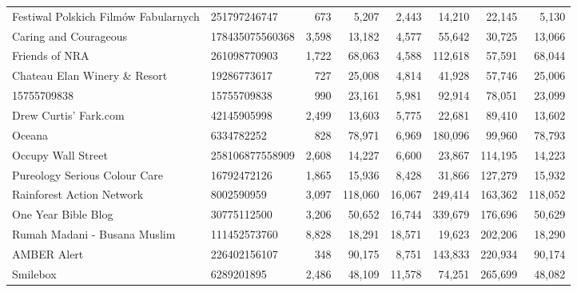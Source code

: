\begin{longtable}{llrrrrrr}
              Festiwal Polskich Filmów Fabularnych &     251797246747 &     673 &       5,207 &      2,443 &      14,210 &      22,145 &     5,130 \\
                             Caring and Courageous &  178435075560368 &   3,598 &      13,182 &      4,577 &      55,642 &      30,725 &    13,066 \\
                                    Friends of NRA &     261098770903 &   1,722 &      68,063 &      4,588 &     112,618 &      57,591 &    68,044 \\
                     Chateau Elan Winery \& Resort &      19286773617 &     727 &      25,008 &      4,814 &      41,928 &      57,746 &    25,006 \\
                                       15755709838 &      15755709838 &     990 &      23,161 &      5,981 &      92,914 &      78,051 &    23,099 \\
                             Drew Curtis' Fark.com &      42145905998 &   2,499 &      13,603 &      5,775 &      22,681 &      89,410 &    13,602 \\
                                            Oceana &       6334782252 &     828 &      78,971 &      6,969 &     180,096 &      99,960 &    78,793 \\
                                Occupy Wall Street &  258106877558909 &   2,608 &      14,227 &      6,600 &      23,867 &     114,195 &    14,223 \\
                     Pureology Serious Colour Care &      16792472126 &   1,865 &      15,936 &      8,428 &      31,866 &     127,279 &    15,932 \\
                         Rainforest Action Network &       8002590959 &   3,097 &     118,060 &     16,067 &     249,414 &     163,362 &   118,052 \\
                               One Year Bible Blog &      30775112500 &   3,206 &      50,652 &     16,744 &     339,679 &     176,696 &    50,629 \\
                      Rumah Madani - Busana Muslim &     111452573760 &   8,828 &      18,291 &     18,571 &      19,623 &     202,206 &    18,290 \\
                                       AMBER Alert &     226402156107 &     348 &      90,175 &      8,751 &     143,833 &     220,934 &    90,174 \\
                                          Smilebox &       6289201895 &   2,486 &      48,109 &     11,578 &      74,251 &     265,699 &    48,082 \\

\end{longtable}
